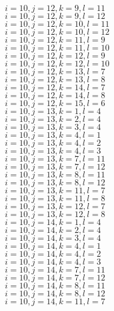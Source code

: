 \documentclass[14pt]{article}
\begin{document}
    $i=10,j=12,k=9,l=11 $ \\ 
    $i=10,j=12,k=9,l=12 $ \\ 
    $i=10,j=12,k=10,l=11 $ \\ 
    $i=10,j=12,k=10,l=12 $ \\ 
    $i=10,j=12,k=11,l=9 $ \\ 
    $i=10,j=12,k=11,l=10 $ \\ 
    $i=10,j=12,k=12,l=9 $ \\ 
    $i=10,j=12,k=12,l=10 $ \\ 
    $i=10,j=12,k=13,l=7 $ \\ 
    $i=10,j=12,k=13,l=8 $ \\ 
    $i=10,j=12,k=14,l=7 $ \\ 
    $i=10,j=12,k=14,l=8 $ \\ 
    $i=10,j=12,k=15,l=6 $ \\ 
    $i=10,j=13,k=1,l=4 $ \\ 
    $i=10,j=13,k=2,l=4 $ \\ 
    $i=10,j=13,k=3,l=4 $ \\ 
    $i=10,j=13,k=4,l=1 $ \\ 
    $i=10,j=13,k=4,l=2 $ \\ 
    $i=10,j=13,k=4,l=3 $ \\ 
    $i=10,j=13,k=7,l=11 $ \\ 
    $i=10,j=13,k=7,l=12 $ \\ 
    $i=10,j=13,k=8,l=11 $ \\ 
    $i=10,j=13,k=8,l=12 $ \\ 
    $i=10,j=13,k=11,l=7 $ \\ 
    $i=10,j=13,k=11,l=8 $ \\ 
    $i=10,j=13,k=12,l=7 $ \\ 
    $i=10,j=13,k=12,l=8 $ \\ 
    $i=10,j=14,k=1,l=4 $ \\ 
    $i=10,j=14,k=2,l=4 $ \\ 
    $i=10,j=14,k=3,l=4 $ \\ 
    $i=10,j=14,k=4,l=1 $ \\ 
    $i=10,j=14,k=4,l=2 $ \\ 
    $i=10,j=14,k=4,l=3 $ \\ 
    $i=10,j=14,k=7,l=11 $ \\ 
    $i=10,j=14,k=7,l=12 $ \\ 
    $i=10,j=14,k=8,l=11 $ \\ 
    $i=10,j=14,k=8,l=12 $ \\ 
    $i=10,j=14,k=11,l=7 $ \\ 
\end{document}
